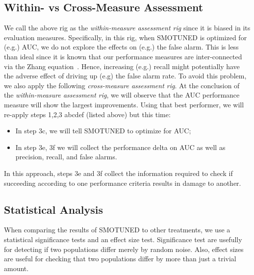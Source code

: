 \documentclass[10pt,conference]{IEEEtran}
\newcommand{\bi}{\begin{itemize}[leftmargin=0.4cm]}
\newcommand{\ei}{\end{itemize}}
\theoremstyle{break}
\theoremstyle{break}
\begin{document}
\subsection{Within- vs Cross-Measure Assessment}
\label{sect:wcm}
We call the above rig as the {\em within-measure assessment rig} since it is  biased in its evaluation measures. Specifically,  in this rig,
when SMOTUNED is optimized for (e.g.) AUC, we do not explore the effects on (e.g.) the false alarm. This is less than ideal
since it is known that our performance measures are inter-connected via the Zhang equation~\cite{zhang2007comments}. Hence, increasing (e.g.) recall might potentially have the adverse
effect of  driving up (e.g) the false alarm rate. 
To avoid this problem, we also apply the following {\em cross-measure assessment rig}.
At the conclusion of the {\em within-measure assessment rig}, we will observe  that the AUC performance measure will show the largest improvements. Using that best performer, we will re-apply steps 1,2,3 abcdef (listed above) but this time:
\bi
\item In step 3c, we will tell SMOTUNED to optimize for AUC;
\item In step 3e, 3f we will collect the performance delta on AUC as well as precision, recall,
and false alarms.
\ei
In this approach, steps 3e and 3f collect the information required   to check if succeeding according to one performance criteria results in damage to another.


\subsection{Statistical Analysis}

When comparing the results of SMOTUNED to other
treatments, we use a statistical
significance tests and an effect size test.
Significance test are usefully for detecting if two populations
differ merely by random noise. 
Also, effect sizes are useful for checking that two populations differ by more than just a trivial amount.
\end{document}
